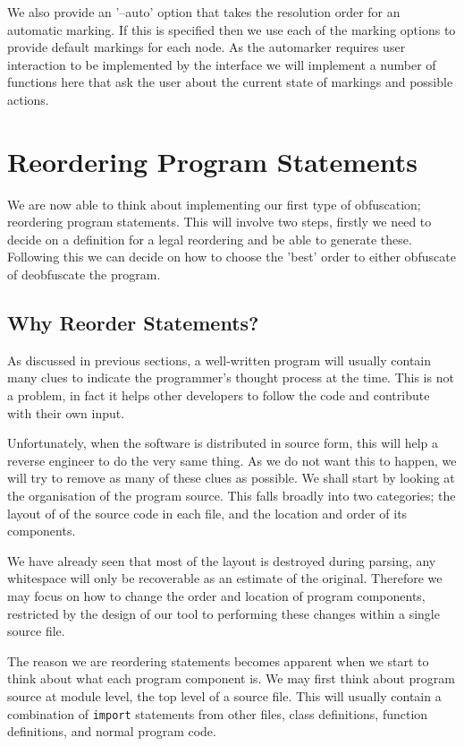 \documentclass{report}
\begin{document}
We also provide an '--auto' option that takes the resolution order for an automatic marking. If this is specified then we use each of the
marking options to provide default markings for each node. As the automarker requires user interaction to be implemented by the interface
we will implement a number of functions here that ask the user about the current state of markings and possible actions.

\section{Reordering Program Statements}

We are now able to think about implementing our first type of obfuscation; reordering program statements. This will involve two steps,
firstly we need to decide on a definition for a legal reordering and be able to generate these. Following this we can decide on how to
choose the 'best' order to either obfuscate of deobfuscate the program.

\subsection{Why Reorder Statements?}

As discussed in previous sections, a well-written program will usually contain many clues to indicate the programmer's thought process
at the time. This is not a problem, in fact it helps other developers to follow the code and contribute with their own input. 

Unfortunately, when the software is distributed in source form, this will help a reverse engineer to do the very same thing. As we do not want
this to happen, we will try to remove as many of these clues as possible. We shall start by looking at the organisation of the program source.
This falls broadly into two categories; the layout of of the source code in each file, and the location and order of its components. 

We have already seen that most of the layout is destroyed during parsing, any whitespace will only be recoverable as an estimate of the original.
Therefore we may focus on how to change the order and location of program components, restricted by the design of our tool to performing these
changes within a single source file.

The reason we are reordering statements becomes apparent when we start to think about what each program component is. We may first think about
program source at module level, the top level of a source file. This will usually contain a combination of \texttt{import} statements from
other files, class definitions, function definitions, and normal program code.
\end{document}
